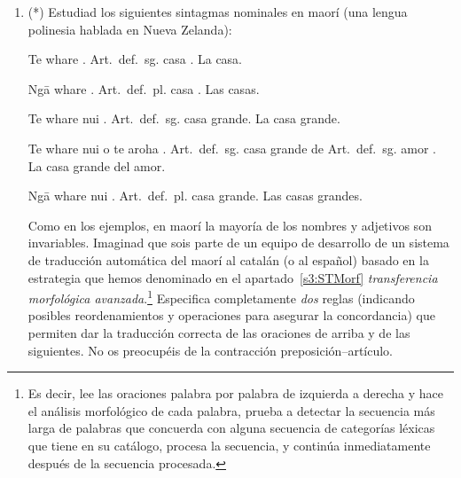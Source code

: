 \begin{enumerate}
\item (*) Estudiad los siguientes sintagmas nominales en maorí (una lengua polinesia hablada en Nueva Zelanda): 

\begin{example} \gll Te whare . \textsf{Art.\ def.\ sg.} casa . \glt La casa. \glend

\end{example} 

\begin{example} \gll Ng\={a} whare . \textsf{Art.\ def.\ pl.} casa . \glt Las casas. \glend

\end{example} 

\begin{example} \gll Te whare nui . \textsf{Art.\ def.\ sg.} casa grande. \glt La casa grande. \glend

\end{example} 

\begin{example} \gll Te whare nui o te aroha . \textsf{Art.\ def.\ sg.} casa grande de \textsf{Art.\ def.\ sg.} amor . \glt La casa grande del amor. \glend

\end{example} 

\begin{example} \gll Ng\={a} whare nui . \textsf{Art.\ def.\ pl.} casa grande. \glt Las casas grandes. \glend

\end{example} 

Como en los ejemplos, en maorí la mayoría de los nombres y adjetivos son invariables. Imaginad que sois parte de un equipo de desarrollo de un sistema de traducción automática del maorí al catalán (o al español) basado en la estrategia que hemos denominado en el apartado~\ref{s3:STMorf} \emph{transferencia morfológica avanzada}.\footnote{Es decir, lee las oraciones palabra por palabra de izquierda a derecha y hace el análisis morfológico de cada palabra, prueba a detectar la secuencia más larga de palabras que concuerda con alguna secuencia de categorías léxicas que tiene en su catálogo, procesa la secuencia, y continúa inmediatamente después de la secuencia procesada.} Especifica completamente \emph{dos} reglas (indicando posibles reordenamientos y operaciones para asegurar la concordancia) que permiten dar la traducción correcta de las oraciones de arriba y de las siguientes. No os preocupéis de la contracción preposición--artículo. 


\end{enumerate}
